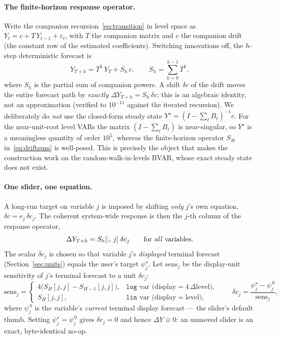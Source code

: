 \documentclass[11pt]{article}
\theoremstyle{definition}
\theoremstyle{remark}
\begin{document}
\paragraph{The finite-horizon response operator.}
Write the companion recursion~\eqref{eq:transition} in level space as
$Y_t = c + T\,Y_{t-1} + \varepsilon_t$, with $T$ the companion matrix
and $c$ the companion drift (the constant row of the estimated
coefficients). Switching innovations off, the $h$-step deterministic
forecast is
\begin{equation}\label{eq:driftsum}
  Y_{T+h} = T^{h}\,Y_T + S_h\,c,
  \qquad
  S_h = \sum_{k=0}^{h-1} T^{k},
\end{equation}
where $S_h$ is the partial sum of companion powers. A shift $\delta c$
of the drift moves the entire forecast path by \emph{exactly}
$\Delta Y_{T+h} = S_h\,\delta c$; this is an algebraic identity, not an
approximation (verified to $10^{-11}$ against the iterated recursion).
We deliberately do \emph{not} use the closed-form steady state
$Y^\star = (I - \sum_\ell B_\ell)^{-1} c$. For the near-unit-root level
VARs the matrix $(I - \sum_\ell B_\ell)$ is near-singular, so $Y^\star$
is a meaningless quantity of order $10^5$, whereas the finite-horizon
operator $S_H$ in~\eqref{eq:driftsum} is well-posed. This is precisely
the object that makes the construction work on the random-walk-in-levels
BVAR, whose exact steady state does not exist.

\paragraph{One slider, one equation.}
A long-run target on variable $j$ is imposed by shifting \emph{only}
$j$'s own equation, $\delta c = e_j\,\delta c_j$. The coherent
system-wide response is then the $j$-th column of the response operator,
\begin{equation}\label{eq:driftcol}
  \Delta Y_{T+h} = S_h[:,\,j]\;\delta c_j
  \qquad\text{for \emph{all} variables.}
\end{equation}
The scalar $\delta c_j$ is chosen so that variable $j$'s
\emph{displayed} terminal forecast (Section~\ref{sec:units}) equals the
user's target $\psi^\star_j$. Let $\mathrm{sens}_j$ be the
display-unit sensitivity of $j$'s terminal forecast to a unit
$\delta c_j$:
\begin{equation}\label{eq:driftsens}
  \mathrm{sens}_j =
  \begin{cases}
    4\bigl(S_H[j,j] - S_{H-1}[j,j]\bigr), & \texttt{log} \text{ var (display}=4\,\Delta\text{level)},\\[2pt]
    S_H[j,j], & \texttt{lin} \text{ var (display}=\text{level)},
  \end{cases}
  \qquad
  \delta c_j = \frac{\psi^\star_j - \psi^{\,0}_j}{\mathrm{sens}_j},
\end{equation}
where $\psi^{\,0}_j$ is the variable's \emph{current} terminal display
forecast --- the slider's default thumb. Setting
$\psi^\star_j = \psi^{\,0}_j$ gives $\delta c_j = 0$ and hence
$\Delta Y \equiv 0$: an unmoved slider is an exact, byte-identical
no-op.
\end{document}
